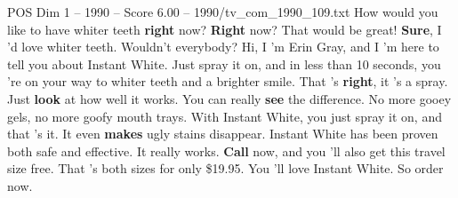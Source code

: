 \begin{textsample}{POS Dim 1 – 1990 – Score 6.00 – 1990/tv\_com\_1990\_109.txt}  \label{ex:f1_pos_051}
How would you like to have whiter teeth \textbf{right} now? \textbf{Right} now?
That would be great! \textbf{Sure}, I 'd love whiter teeth.
Wouldn't everybody?
Hi, I 'm Erin Gray, and I 'm here to tell you about Instant White.
Just spray it on, and in less than 10 seconds, you 're on your way to whiter teeth and a brighter smile.
That 's \textbf{right}, it 's a spray.
Just \textbf{look} at how well it works.
You can really \textbf{see} the difference.
No more gooey gels, no more goofy mouth trays.
With Instant White, you just spray it on, and that 's it.
It even \textbf{makes} ugly stains disappear.
Instant White has been proven both safe and effective.
It really works. \textbf{Call} now, and you 'll also get this travel size free.
That 's both sizes for only \$19.95.
You 'll love Instant White.
So order now.

\end{textsample}
